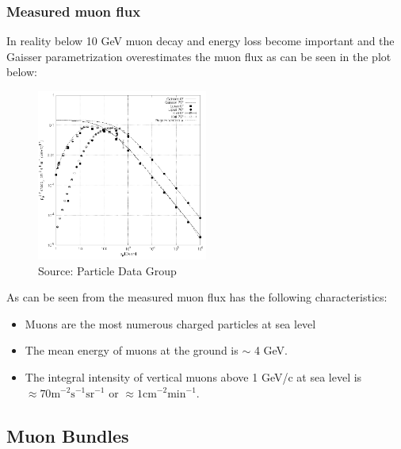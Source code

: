 \documentclass[
  letterpaper,
  DIV=11,
  numbers=noendperiod]{scrreprt}
\providecommand{\tightlist}{%
  \setlength{\itemsep}{0pt}\setlength{\parskip}{0pt}}\usepackage{longtable,booktabs,array}
\begin{document}
\subsubsection*{Measured muon flux}\label{measured-muon-flux}

In reality below 10 GeV muon decay and energy loss become important and
the Gaisser parametrization overestimates the muon flux as can be seen
in the plot below:

\begin{figure}[H]

{\centering \includegraphics[width=0.5\textwidth,height=\textheight]{images/atmmu.png}

}

\caption{Source: Particle Data Group}

\end{figure}%

As can be seen from the measured muon flux has the following
characteristics:

\begin{itemize}
\tightlist
\item
  Muons are the most numerous charged particles at sea level
\item
  The mean energy of muons at the ground is \(\sim\) 4 GeV.
\item
  The integral intensity of vertical muons above 1 GeV/c at sea level is
  \(\approx 70 \mathrm{m}^{-2} \mathrm{s}^{-1} \mathrm{sr}^{-1}\) or
  \(\approx 1 \mathrm{cm}^{-2} \mathrm{min}^{-1}\).
\end{itemize}

\subsection*{Muon Bundles}\label{muon-bundles}
\end{document}
